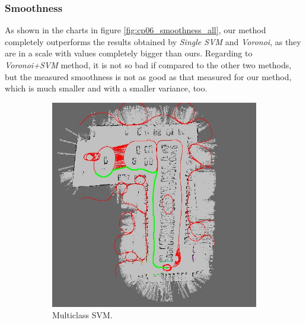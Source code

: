 \subsubsection{Smoothness}\label{ch:chapter06_02_02_02}

As shown in the charts in figure \ref{fig:cp06_smoothness_all}, our method completely outperforms the results obtained by \textit{Single \ac{SVM}} and \textit{Voronoi}, as they are in a scale with values completely bigger than ours. Regarding to \textit{Voronoi+\ac{SVM}} method, it is not so bad if compared to the other two methods, but the measured smoothness is not as good as that measured for our method, which is much smaller and with a smaller variance, too.

\begin{figure}[h!]
  \centering
  \begin{subfigure}[b]{0.45\textwidth}
	  \centering
	  \includegraphics[width=\textwidth,height=\textwidth, trim=0 0 0 0,clip]{figure14}
	  \caption{Multiclass \ac{SVM}.}
	  \label{fig:cp06_multi_svm_final}
  \end{subfigure}%
  ~
  \begin{subfigure}[b]{0.45\textwidth}
	  \centering

\end{subfigure}
\end{figure}
